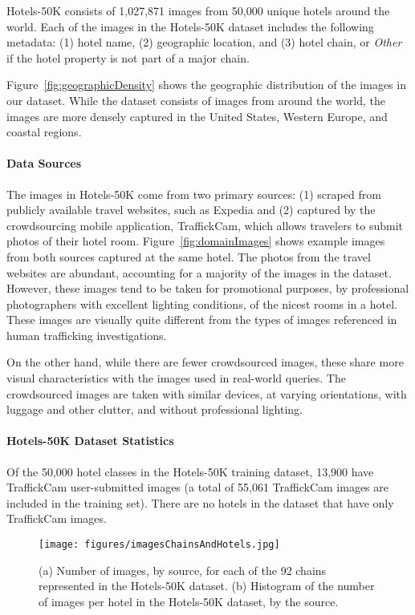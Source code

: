 Hotels-50K consists of 1,027,871 images from 50,000 unique hotels around the world. 
Each of the images in the Hotels-50K dataset includes the following metadata: (1) hotel name, (2) geographic location, and (3) hotel chain, or \emph{Other} if the hotel property is not part of a major chain.

Figure~\ref{fig:geographicDensity} shows the geographic distribution of the images in our dataset. While the dataset consists of images from around the world, the images are more densely captured in the United States, Western Europe, and coastal regions.

\paragraph{Data Sources} The images in Hotels-50K come from two primary sources: (1) scraped from publicly available travel websites, such as Expedia and (2) captured by the crowdsourcing mobile application, TraffickCam, which allows travelers to submit photos of their hotel room. Figure~\ref{fig:domainImages} shows example images from both sources captured at the same hotel. The photos from the travel websites are abundant, accounting for a majority of the images in the dataset. However, these images tend to be taken for 
promotional purposes, by professional photographers with excellent lighting 
conditions, of the nicest rooms in a hotel. These images are visually quite different from the types of images referenced in human trafficking investigations.

On the other hand, while there are fewer crowdsourced images, these share more visual characteristics with the images used in real-world queries. The crowdsourced images are taken with similar devices, at varying orientations, with luggage and other clutter, and without professional lighting.

\paragraph{Hotels-50K Dataset Statistics} Of the 50,000 hotel classes in the Hotels-50K training dataset, 13,900 have TraffickCam user-submitted images (a total of 55,061 TraffickCam images are included in the training set). There are no hotels in the dataset that have only TraffickCam images.

\begin{figure*}
    \centering    \texttt{[image: figures/imagesChainsAndHotels.jpg]}
    \caption{(a) Number of images, by source, for each of the 92 chains represented in the Hotels-50K dataset. (b) Histogram of the number of images per hotel in the Hotels-50K dataset, by the source.}
    \label{fig:imsPerClass}
\end{figure*}

